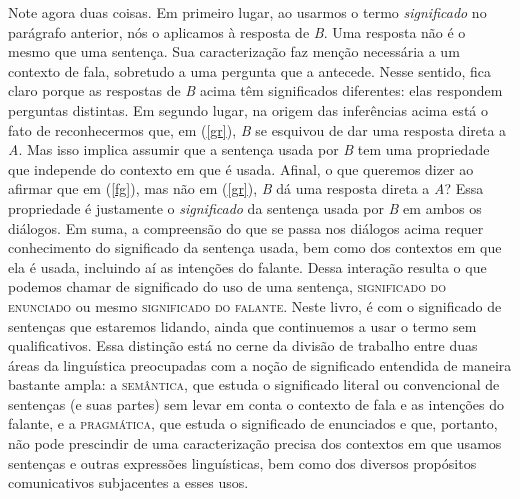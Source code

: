Note agora duas coisas. Em primeiro lugar, ao usarmos o termo
\textit{significado} no parágrafo anterior, nós o aplicamos à
resposta de \textit{B}. Uma resposta não é o mesmo que uma
sentença. Sua caracteriza\-ção faz men\-ção necessária a um
contexto de fala, sobretudo a uma pergunta que a antecede. Nesse
sentido, fica claro porque as respostas de \textit{B} acima têm
significados diferentes: elas respondem perguntas distintas. Em
segundo lugar, na origem das inferências acima está o fato de
reconhecermos que, em (\ref{gr}), \textit{B} se esquivou de dar uma
resposta direta a \textit{A}. Mas isso implica assumir que a
sentença usada por \textit{B} tem uma propriedade que independe do
contexto em que é usada. Afinal, o que queremos dizer ao afirmar
que em (\ref{fg}), mas não em (\ref{gr}), \textit{B} dá uma resposta
direta a \textit{A}? Essa propriedade é justamente o
\textit{significado} da sentença usada por \textit{B} em ambos os
diálogos. Em suma, a compreensão do que se passa nos diálogos
acima requer conhecimento do significado da sentença
usada, bem como dos contextos em que ela é usada, incluindo aí as
intenções do falante. Dessa intera\-ção resulta o que podemos
chamar de significado do uso de uma sentença,
\textsc{significado do enunciado} ou mesmo \textsc{significado do
falante}. Neste livro, é com o significado de sen\-ten\-ças que
estaremos lidando, ainda que continuemos a usar o termo sem
qualificativos. Essa distin\-ção está no cerne da divisão de
trabalho entre duas áreas da linguística preocupadas com a no\-ção
de significado entendida de maneira bastante ampla: a
\textsc{semântica}, que estuda o significado literal ou convencional de sen\-ten\-ças (e suas partes) sem levar em conta o
contexto de fala e as intenções do falante, e a \textsc{pragmática}, que
estuda o significado de enunciados e que, portanto, não pode
prescindir de uma caracteriza\-ção precisa dos contextos em que
usamos sen\-ten\-ças e outras expressões linguísticas, bem como
dos diversos propósitos comunicativos subjacentes a esses usos.

\bigskip

